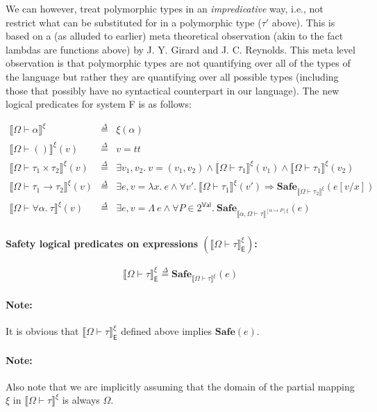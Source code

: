 \documentclass{article}
\newcommand{\TT}{\mathit{tt}}
\newcommand{\EXP}{\mathsf{E}}
\newcommand{\VAL}{\mathsf{Val}}
\newcommand{\UNT}{()}
\newcommand{\defeq}{\overset{\Delta}{=}}
\newcommand{\semtyp}[2]{\llbracket #2 \rrbracket_{#1}}
\begin{document}
We can however, treat polymorphic types in an
\emph{impredicative} way, i.e., not restrict what can be
substituted for in a polymorphic type ($\tau'$ above).
This is based on a (as alluded to earlier) meta theoretical
observation (akin to the fact lambdas are functions above) by J. Y. Girard
and J. C. Reynolds.
This meta level observation is that polymorphic types are
not quantifying over all of the types of the language but rather
they are quantifying over all possible types (including those that possibly have no syntactical counterpart in our language).
The new logical predicates for system F is as follows:

\[
\begin{array}{lll}
\semtyp{}{\Omega \vdash \alpha}^{\xi} &\defeq& \xi(\alpha)\\
\semtyp{}{\Omega \vdash \UNT}^{\xi}(v) &\defeq& v = \TT\\
\semtyp{}{\Omega \vdash \tau_1 \times \tau_2}^{\xi}(v) &\defeq& \exists v_1, v_2.~v = (v_1, v_2) \land
\semtyp{}{\Omega \vdash \tau_1}^{\xi}(v_1) \land \semtyp{}{\Omega \vdash \tau_1}^{\xi}(v_2)\\
\semtyp{}{\Omega \vdash \tau_1 \to \tau_2}^{\xi}(v) &\defeq& \exists e, v = \lambda x.~e\land
\forall v'.~\semtyp{}{\Omega \vdash \tau_1}^{\xi}(v') \Rightarrow \mathbf{Safe}_{\semtyp{}{\Omega \vdash \tau_2}^{\xi}}(e[v/x])\\
\semtyp{}{\Omega \vdash \forall \alpha.~\tau}^{\xi}(v) &\defeq& \exists e, v = \Lambda~e\land
\forall P \in 2^{\VAL}.~\mathbf{Safe}_{\semtyp{}{\alpha, \Omega \vdash \tau}^{[\alpha \mapsto P]\xi}}(e)
\end{array}
\]

\paragraph{Safety logical predicates on expressions $\left(\semtyp{\EXP}{\Omega \vdash \tau}^{\xi}\right)$:}
\[
\semtyp{\EXP}{\Omega \vdash \tau}^{\xi} \defeq \mathbf{Safe}_{\semtyp{}{\Omega \vdash \tau}^{\xi}}(e)
\]

\paragraph{Note:} It is obvious that $\semtyp{\EXP}{\Omega \vdash \tau}^{\xi}$
defined above implies $\mathbf{Safe}(e)$.
\paragraph{Note:} Also note that we are implicitly assuming that the domain of
the partial mapping $\xi$ in $\semtyp{}{\Omega \vdash \tau}^{\xi}$ is always $\Omega$.
\end{document}
